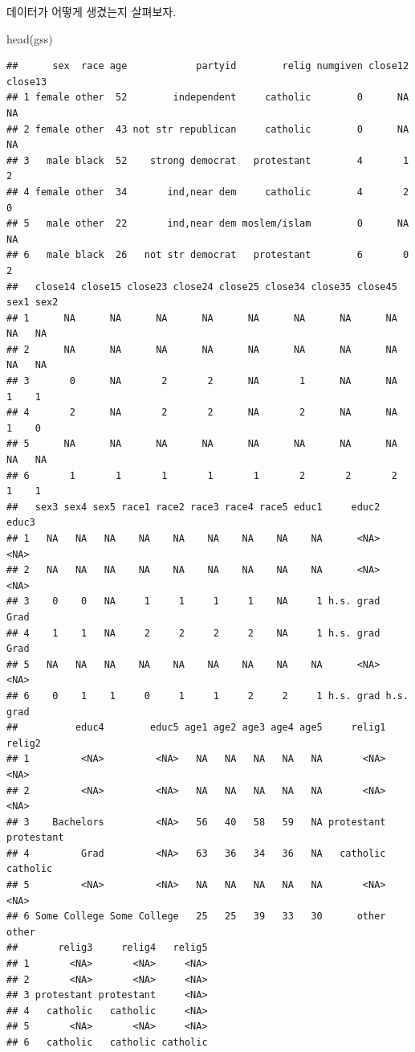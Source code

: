 \documentclass[
]{book}
\newenvironment{Shaded}{\begin{snugshade}}{\end{snugshade}}
\newcommand{\FunctionTok}[1]{\textcolor[rgb]{0.00,0.00,0.00}{#1}}
\newcommand{\NormalTok}[1]{#1}
\begin{document}
데이터가 어떻게 생겼는지 살펴보자.

\begin{Shaded}
\begin{Highlighting}[]
\FunctionTok{head}\NormalTok{(gss)}
\end{Highlighting}
\end{Shaded}

\begin{verbatim}
##      sex  race age            partyid        relig numgiven close12 close13
## 1 female other  52        independent     catholic        0      NA      NA
## 2 female other  43 not str republican     catholic        0      NA      NA
## 3   male black  52    strong democrat   protestant        4       1       2
## 4 female other  34       ind,near dem     catholic        4       2       0
## 5   male other  22       ind,near dem moslem/islam        0      NA      NA
## 6   male black  26   not str democrat   protestant        6       0       2
##   close14 close15 close23 close24 close25 close34 close35 close45 sex1 sex2
## 1      NA      NA      NA      NA      NA      NA      NA      NA   NA   NA
## 2      NA      NA      NA      NA      NA      NA      NA      NA   NA   NA
## 3       0      NA       2       2      NA       1      NA      NA    1    1
## 4       2      NA       2       2      NA       2      NA      NA    1    0
## 5      NA      NA      NA      NA      NA      NA      NA      NA   NA   NA
## 6       1       1       1       1       1       2       2       2    1    1
##   sex3 sex4 sex5 race1 race2 race3 race4 race5 educ1     educ2     educ3
## 1   NA   NA   NA    NA    NA    NA    NA    NA    NA      <NA>      <NA>
## 2   NA   NA   NA    NA    NA    NA    NA    NA    NA      <NA>      <NA>
## 3    0    0   NA     1     1     1     1    NA     1 h.s. grad      Grad
## 4    1    1   NA     2     2     2     2    NA     1 h.s. grad      Grad
## 5   NA   NA   NA    NA    NA    NA    NA    NA    NA      <NA>      <NA>
## 6    0    1    1     0     1     1     2     2     1 h.s. grad h.s. grad
##          educ4        educ5 age1 age2 age3 age4 age5     relig1     relig2
## 1         <NA>         <NA>   NA   NA   NA   NA   NA       <NA>       <NA>
## 2         <NA>         <NA>   NA   NA   NA   NA   NA       <NA>       <NA>
## 3    Bachelors         <NA>   56   40   58   59   NA protestant protestant
## 4         Grad         <NA>   63   36   34   36   NA   catholic   catholic
## 5         <NA>         <NA>   NA   NA   NA   NA   NA       <NA>       <NA>
## 6 Some College Some College   25   25   39   33   30      other      other
##       relig3     relig4   relig5
## 1       <NA>       <NA>     <NA>
## 2       <NA>       <NA>     <NA>
## 3 protestant protestant     <NA>
## 4   catholic   catholic     <NA>
## 5       <NA>       <NA>     <NA>
## 6   catholic   catholic catholic
\end{verbatim}
\end{document}

